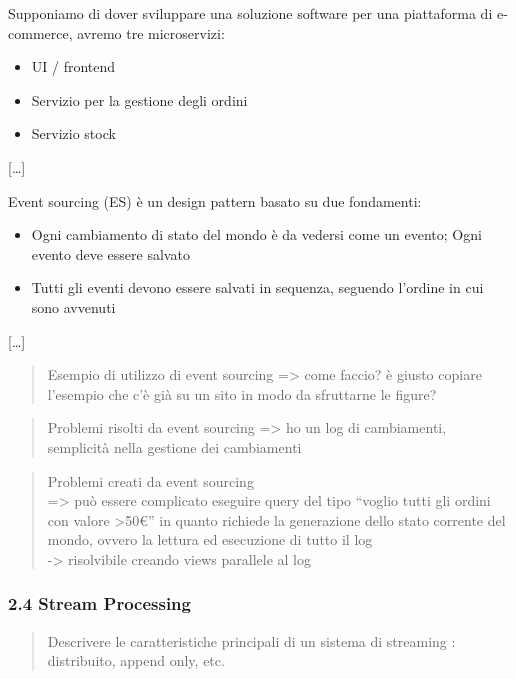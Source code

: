 \documentclass[]{article}
\newcommand{\euro}{€}
\providecommand{\tightlist}{%
  \setlength{\itemsep}{0pt}\setlength{\parskip}{0pt}}
\begin{document}
Supponiamo di dover sviluppare una soluzione software per una
piattaforma di e-commerce, avremo tre microservizi:

\begin{itemize}
\tightlist
\item
  UI / frontend
\item
  Servizio per la gestione degli ordini
\item
  Servizio stock
\end{itemize}

{[}\ldots{}{]}

Event sourcing (ES) è un design pattern basato su due fondamenti:

\begin{itemize}
\tightlist
\item
  Ogni cambiamento di stato del mondo è da vedersi come un evento; Ogni
  evento deve essere salvato
\item
  Tutti gli eventi devono essere salvati in sequenza, seguendo l'ordine
  in cui sono avvenuti
\end{itemize}

{[}\ldots{}{]}

\begin{quote}
Esempio di utilizzo di event sourcing =\textgreater{} come faccio? è
giusto copiare l'esempio che c'è già su un sito in modo da sfruttarne le
figure?
\end{quote}

\begin{quote}
Problemi risolti da event sourcing =\textgreater{} ho un log di
cambiamenti, semplicità nella gestione dei cambiamenti
\end{quote}

\begin{quote}
Problemi creati da event sourcing\\
=\textgreater{} può essere complicato eseguire query del tipo ``voglio
tutti gli ordini con valore \textgreater{}50\euro{}'' in quanto richiede
la generazione dello stato corrente del mondo, ovvero la lettura ed
esecuzione di tutto il log\\
-\textgreater{} risolvibile creando views parallele al log
\end{quote}

\subsubsection{2.4 Stream Processing}\label{stream-processing}

\begin{quote}
Descrivere le caratteristiche principali di un sistema di streaming :
distribuito, append only, etc.
\end{quote}
\end{document}
